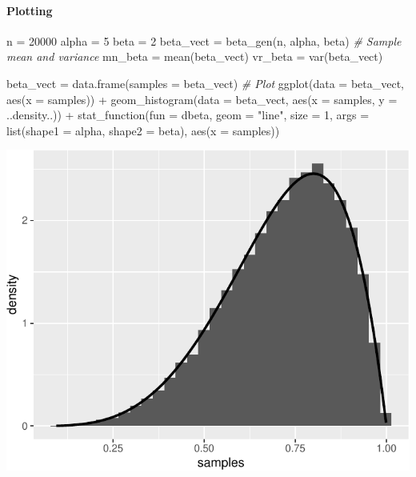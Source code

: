 \documentclass[
]{article}
\newenvironment{Shaded}{\begin{snugshade}}{\end{snugshade}}
\newcommand{\AttributeTok}[1]{\textcolor[rgb]{0.77,0.63,0.00}{#1}}
\newcommand{\CommentTok}[1]{\textcolor[rgb]{0.56,0.35,0.01}{\textit{#1}}}
\newcommand{\DecValTok}[1]{\textcolor[rgb]{0.00,0.00,0.81}{#1}}
\newcommand{\FunctionTok}[1]{\textcolor[rgb]{0.00,0.00,0.00}{#1}}
\newcommand{\NormalTok}[1]{#1}
\newcommand{\OtherTok}[1]{\textcolor[rgb]{0.56,0.35,0.01}{#1}}
\newcommand{\SpecialCharTok}[1]{\textcolor[rgb]{0.00,0.00,0.00}{#1}}
\newcommand{\StringTok}[1]{\textcolor[rgb]{0.31,0.60,0.02}{#1}}
\begin{document}
\hypertarget{plotting-1}{%
\paragraph{Plotting}\label{plotting-1}}

\begin{Shaded}
\begin{Highlighting}[]
\NormalTok{n }\OtherTok{=} \DecValTok{20000}
\NormalTok{alpha }\OtherTok{=} \DecValTok{5}
\NormalTok{beta }\OtherTok{=} \DecValTok{2}
\NormalTok{beta\_vect }\OtherTok{=} \FunctionTok{beta\_gen}\NormalTok{(n, alpha, beta)}
\CommentTok{\# Sample mean and variance}
\NormalTok{mn\_beta }\OtherTok{=} \FunctionTok{mean}\NormalTok{(beta\_vect)}
\NormalTok{vr\_beta }\OtherTok{=} \FunctionTok{var}\NormalTok{(beta\_vect)}

\NormalTok{beta\_vect }\OtherTok{=} \FunctionTok{data.frame}\NormalTok{(}\AttributeTok{samples =}\NormalTok{ beta\_vect)}
\CommentTok{\# Plot}
\FunctionTok{ggplot}\NormalTok{(}\AttributeTok{data =}\NormalTok{ beta\_vect, }\FunctionTok{aes}\NormalTok{(}\AttributeTok{x =}\NormalTok{ samples)) }\SpecialCharTok{+} \FunctionTok{geom\_histogram}\NormalTok{(}\AttributeTok{data =}\NormalTok{ beta\_vect, }\FunctionTok{aes}\NormalTok{(}\AttributeTok{x =}\NormalTok{ samples, }
    \AttributeTok{y =}\NormalTok{ ..density..)) }\SpecialCharTok{+} \FunctionTok{stat\_function}\NormalTok{(}\AttributeTok{fun =}\NormalTok{ dbeta, }\AttributeTok{geom =} \StringTok{"line"}\NormalTok{, }\AttributeTok{size =} \DecValTok{1}\NormalTok{, }\AttributeTok{args =} \FunctionTok{list}\NormalTok{(}\AttributeTok{shape1 =}\NormalTok{ alpha, }
    \AttributeTok{shape2 =}\NormalTok{ beta), }\FunctionTok{aes}\NormalTok{(}\AttributeTok{x =}\NormalTok{ samples))}
\end{Highlighting}
\end{Shaded}

\begin{center}\includegraphics{Project-1_files/figure-latex/unnamed-chunk-14-1} \end{center}
\end{document}

